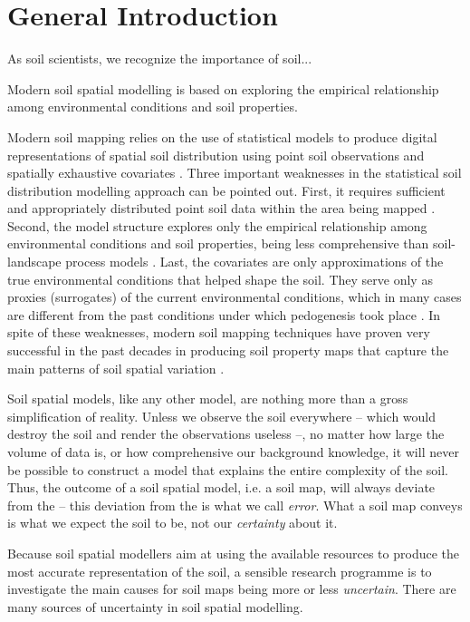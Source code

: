 \setcounter{page}{1}
\artigofalse
\chapter{General Introduction}
\label{chap:introduction}

As soil scientists, we recognize the importance of soil...

Modern soil spatial modelling is based on exploring the empirical relationship among environmental conditions 
and soil properties.

Modern soil mapping relies on the use of statistical models to produce digital representations of spatial 
soil distribution using point soil observations and spatially exhaustive covariates \cite{McBratneyEtAl2003, 
ScullEtAl2003, Florinsky2012}. Three important weaknesses in the statistical soil distribution modelling 
approach can be pointed out. First, it requires sufficient and appropriately distributed point soil data 
within 
the area being mapped \cite{CarreEtAl2007a}. Second, the model structure explores only the empirical 
relationship among environmental conditions and soil properties, being less comprehensive than soil-landscape 
process models \cite{Grunwald2009}. Last, the covariates are only approximations of the true environmental 
conditions that helped shape the soil. They serve only as proxies (surrogates) of the current environmental 
conditions, which in many cases are different from the past conditions under which pedogenesis took place 
\cite{HeuvelinkEtAl2001}. In spite of these weaknesses, modern soil mapping techniques have proven very 
successful in the past decades in producing soil property maps that capture the main patterns of soil spatial 
variation \cite{MooreEtAl1993, McBratneyEtAl2000, Grunwald2009}.


Soil spatial models, like any other model, are nothing more than a gross simplification of reality. Unless we 
observe the soil everywhere -- which would destroy the soil and render the observations useless --, no matter 
how large the volume of data is, or how comprehensive our background knowledge, it will never be possible to 
construct a model that explains the entire complexity of the soil. Thus, the outcome of a soil spatial model, 
i.e. a soil map, will always deviate from the  -- this deviation from the  is what we call 
\emph{error}. What a soil map conveys is what we expect the soil to be, not our \emph{certainty} about it.

Because soil spatial modellers aim at using the available resources to produce the most accurate 
representation of the soil, a sensible research programme is to investigate the main causes for soil maps being 
more or less \emph{uncertain}. There are many sources of uncertainty in soil spatial modelling.



